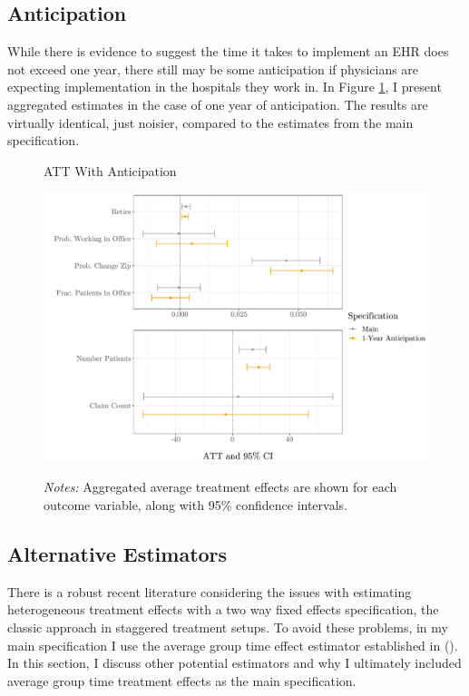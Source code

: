 \documentclass[11pt]{article}
\begin{document}
\subsection{Anticipation}\label{app:anticipation}

While there is evidence to suggest the time it takes to implement an EHR does not exceed one year, there still may be some anticipation if physicians are expecting implementation in the hospitals they work in. In Figure \ref{fig:anticipation}, I present aggregated estimates in the case of one year of anticipation. The results are virtually identical, just noisier, compared to the estimates from the main specification. 

\begin{figure}[ht]
    \centering
    \captionsetup{width=.57\linewidth}
    \caption{ATT With Anticipation}
    \includegraphics[scale=.57]{Objects/anticipation_graph.pdf}
    \label{fig:anticipation}
    \vspace{2mm}
    \caption*{\footnotesize{\textit{Notes:} Aggregated average treatment effects are shown for each outcome variable, along with 95\% confidence intervals.}}
\end{figure}

\subsection{Alternative Estimators}\label{app:estimators}

There is a robust recent literature considering the issues with estimating heterogeneous treatment effects with a two way fixed effects specification, the classic approach in staggered treatment setups. To avoid these problems, in my main specification I use the average group time effect estimator established in \citeauthor{callaway2021difference} (\citeyear{callaway2021difference}). In this section, I discuss other potential estimators and why I ultimately included average group time treatment effects as the main specification. 
\end{document}
